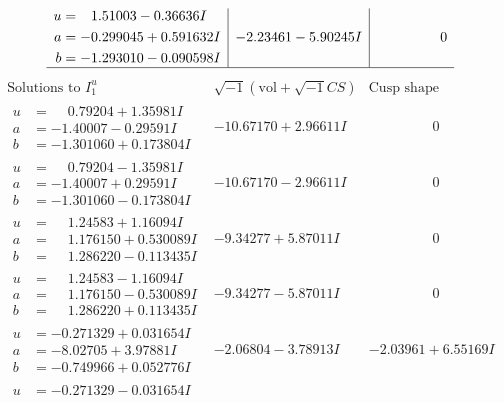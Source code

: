 \documentclass[1p]{elsarticle_modified}
\theoremstyle{definition}
\newcommand{\I}{\sqrt{-1}}
\begin{document}
$$\begin{array}{c|c|c}
\begin{aligned}
u &= \phantom{-}1.51003 - 0.36636 I \\
a &= -0.299045 + 0.591632 I \\
b &= -1.293010 - 0.090598 I\end{aligned}
 & -2.23461 - 5.90245 I & \phantom{-0.000000 } 0\\
 \hline 
 \end{array}$$\newpage$$\begin{array}{c|c|c}  
\text{Solutions to }I^u_{1}& \I (\text{vol} + \sqrt{-1}CS) & \text{Cusp shape}\\
 \hline 
\begin{aligned}
u &= \phantom{-}0.79204 + 1.35981 I \\
a &= -1.40007 - 0.29591 I \\
b &= -1.301060 + 0.173804 I\end{aligned}
 & -10.67170 + 2.96611 I & \phantom{-0.000000 } 0 \\ \hline\begin{aligned}
u &= \phantom{-}0.79204 - 1.35981 I \\
a &= -1.40007 + 0.29591 I \\
b &= -1.301060 - 0.173804 I\end{aligned}
 & -10.67170 - 2.96611 I & \phantom{-0.000000 } 0 \\ \hline\begin{aligned}
u &= \phantom{-}1.24583 + 1.16094 I \\
a &= \phantom{-}1.176150 + 0.530089 I \\
b &= \phantom{-}1.286220 - 0.113435 I\end{aligned}
 & -9.34277 + 5.87011 I & \phantom{-0.000000 } 0 \\ \hline\begin{aligned}
u &= \phantom{-}1.24583 - 1.16094 I \\
a &= \phantom{-}1.176150 - 0.530089 I \\
b &= \phantom{-}1.286220 + 0.113435 I\end{aligned}
 & -9.34277 - 5.87011 I & \phantom{-0.000000 } 0 \\ \hline\begin{aligned}
u &= -0.271329 + 0.031654 I \\
a &= -8.02705 + 3.97881 I \\
b &= -0.749966 + 0.052776 I\end{aligned}
 & -2.06804 - 3.78913 I & -2.03961 + 6.55169 I \\ \hline\begin{aligned}
u &= -0.271329 - 0.031654 I \\

\end{aligned}
\end{array}$$
\end{document}
